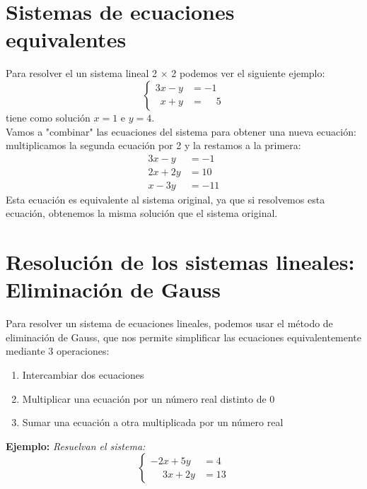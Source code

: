 \section{Sistemas de ecuaciones equivalentes}
Para resolver el un sistema lineal 2 × 2 podemos ver el siguiente ejemplo:
$$
\begin{cases}
    3x - y &= -1\\
    \phantom{3}x + y &= \phantom{-}5
\end{cases}
$$
tiene como solución $x = 1$ e $y = 4$. \\
Vamos a "combinar" las ecuaciones del sistema para obtener una nueva ecuación: multiplicamos la segunda ecuación por 2 y la restamos a la primera:
$$
\begin{aligned}
    3x - y &= -1\\
    2x + 2y &= 10\\
    \hline
    x-3y &= -11
\end{aligned}
$$
Esta ecuación es equivalente al sistema original, ya que si resolvemos esta ecuación, obtenemos la misma solución que el sistema original. \\



\section{Resolución de los sistemas lineales: Eliminación de Gauss}
Para resolver un sistema de ecuaciones lineales, podemos usar el método de eliminación de Gauss, que nos permite simplificar las ecuaciones equivalentemente mediante 3 operaciones:
\begin{enumerate}
    \item Intercambiar dos ecuaciones
    \item Multiplicar una ecuación por un número real distinto de 0
    \item Sumar una ecuación a otra multiplicada por un número real
\end{enumerate}

\noindent \textbf{Ejemplo:} \emph{Resuelvan el sistema:}
$$
\begin{cases}
        -2x + 5y &= 4\\
        \phantom{-}3x + 2y &= 13
\end{cases}
$$

